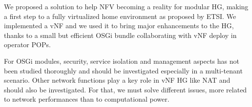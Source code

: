 We proposed a solution to help NFV becoming a reality for modular HG, making a first step to a fully virtualized home environment as proposed by ETSI.
We implemented a vNF and we used it to bring major enhancements to the HG, thanks to a small but efficient OSGi bundle collaborating with vNF deploy in operator POPs.

For OSGi modules, security, service isolation and management aspects has not been studied thoroughly and should be investigated especially in a multi-tenant scenario.
Other network functions play a key role in vNF HG like NAT and should also be investigated.
For that, we must solve different issues, more related to network performances than to computational power. 
